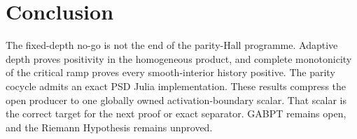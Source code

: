\documentclass[11pt]{article}
\newcommand{\1}{\mathbf 1}
\begin{document}
\section{Conclusion}
The fixed-depth no-go is not the end of the parity-Hall programme. Adaptive
depth proves positivity in the homogeneous product, and complete monotonicity of
the critical ramp proves every smooth-interior history positive. The parity
cocycle admits an exact PSD Julia implementation. These results compress the
open producer to one globally owned activation-boundary scalar. That scalar is
the correct target for the next proof or exact separator. GABPT remains open,
and the Riemann Hypothesis remains unproved.
\end{document}
